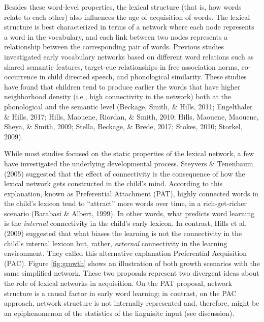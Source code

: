 \documentclass[10pt, letterpaper]{article}
\begin{document}
Besides these word-level properties, the lexical structure (that is, how
words relate to each other) also influences the age of acquisition of
words. The lexical structure is best characterized in terms of a network
where each node represents a word in the vocabulary, and each link
between two nodes represents a relationship between the corresponding
pair of words. Previous studies investigated early vocabulary networks
based on different word relations such as shared semantic features,
target-cue relationships in free association norms, co-occurrence in
child directed speech, and phonological similarity. These studies have
found that children tend to produce earlier the words that have higher
neighborhood density (i.e., high connectivity in the network) both at
the phonological and the semantic level (Beckage, Smith, \& Hills, 2011;
Engelthaler \& Hills, 2017; Hills, Maouene, Riordan, \& Smith, 2010;
Hills, Maouene, Maouene, Sheya, \& Smith, 2009; Stella, Beckage, \&
Brede, 2017; Stokes, 2010; Storkel, 2009).

While most studies focused on the static properties of the lexical
network, a few have investigated the underlying developmental process.
Steyvers \& Tenenbaum (2005) suggested that the effect of connectivity
is the consequence of how the lexical network gets constructed in the
child's mind. According to this explanation, known as Preferential
Attachment (PAT), highly connected words in the child's lexicon tend to
``attract'' more words over time, in a rich-get-richer scenario
(Barabasi \& Albert, 1999). In other words, what predicts word learning
is the \emph{internal} connectivity in the child's early lexicon. In
contrast, Hills et al. (2009) suggested that what biases the learning is
not the connectivity in the child's internal lexicon but, rather,
\emph{external} connectivity in the learning environment. They called
this alternative explanation Preferential Acquisition (PAC). Figure
\ref{fig:growth} shows an illustration of both growth scenarios with the
same simplified network. These two proposals represent two divergent
ideas about the role of lexical networks in acquisition. On the PAT
proposal, network structure is a causal factor in early word learning;
in contrast, on the PAC approach, network structure is not internally
represented and, therefore, might be an epiphenomenon of the statistics
of the linguisitc input (see discussion).
\end{document}
